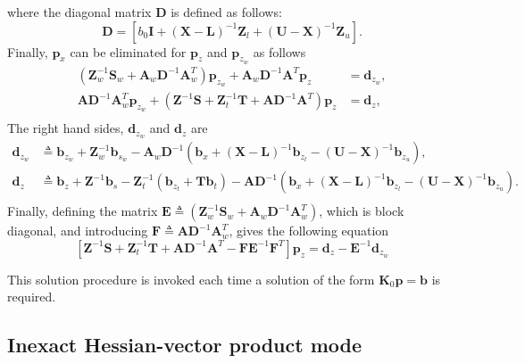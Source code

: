 \documentclass[12pt]{article}
\newcommand{\mb}{\mathbf}
\begin{document}
where the diagonal matrix $\mb{D}$ is defined as follows:
\begin{equation*}
  \mb{D} = \left[ b_{0} \mb{I} + (\mb{X} - \mb{L})^{-1}\mb{Z}_{l} + (\mb{U} - \mb{X})^{-1}\mb{Z}_{u} \right].
\end{equation*}
%
Finally, $\mb{p}_{x}$ can be eliminated for $\mb{p}_{z}$ and $\mb{p}_{z_{w}}$ as follows
\begin{equation}
  \begin{aligned}
    (\mb{Z}_{w}^{-1}\mb{S}_{w} + \mb{A}_{w}\mb{D}^{-1}\mb{A}_{w}^{T})\mb{p}_{z_{w}} + \mb{A}_{w}\mb{D}^{-1}\mb{A}^{T}\mb{p}_{z} &= \mb{d}_{z_{w}}, \\
    \mb{A}\mb{D}^{-1}\mb{A}_{w}^{T} \mb{p}_{z_{w}} + (\mb{Z}^{-1}\mb{S} + \mb{Z}_{t}^{-1}\mb{T} + \mb{A}\mb{D}^{-1}\mb{A}^{T})\mb{p}_{z} &= \mb{d}_{z}, \\
  \end{aligned}
\end{equation}
%
The right hand sides, $\mb{d}_{z_{w}}$ and $\mb{d}_{z}$ are 
\begin{equation*}
  \begin{aligned}
    \mb{d}_{z_{w}} &\triangleq \mb{b}_{z_{w}} + \mb{Z}_{w}^{-1}\mb{b}_{s_{w}} - \mb{A}_{w}\mb{D}^{-1}\left(\mb{b}_{x} + (\mb{X} - \mb{L})^{-1}\mb{b}_{z_{l}} - (\mb{U} - \mb{X})^{-1}\mb{b}_{z_{u}} \right), \\
    \mb{d}_{z} &\triangleq \mb{b}_{z} + \mb{Z}^{-1}\mb{b}_{s} - \mb{Z}_{t}^{-1}(\mb{b}_{z_{t}} + \mb{T}\mb{b}_{t}) - \mb{A}\mb{D}^{-1}\left(\mb{b}_{x} + (\mb{X} - \mb{L})^{-1}\mb{b}_{z_{l}} - (\mb{U} - \mb{X})^{-1}\mb{b}_{z_{u}} \right). \\
  \end{aligned}
\end{equation*}
%
Finally, defining the matrix $\mb{E} \triangleq (\mb{Z}_{w}^{-1}\mb{S}_{w} + \mb{A}_{w}\mb{D}^{-1}\mb{A}_{w}^{T})$, which is block diagonal, and introducing $\mb{F} \triangleq \mb{A}\mb{D}^{-1}\mb{A}_{w}^{T}$, gives the following equation
\begin{equation*}
  \left[\mb{Z}^{-1}\mb{S} + \mb{Z}_{t}^{-1}\mb{T} + \mb{A}\mb{D}^{-1}\mb{A}^{T} - \mb{F}\mb{E}^{-1}\mb{F}^{T} \right]\mb{p}_{z} = \mb{d}_{z} - \mb{E}^{-1} \mb{d}_{z_{w}}
\end{equation*}

This solution procedure is invoked each time a solution of the form $\mb{K}_{0}\mb{p} = \mb{b}$ is required. 

\subsection{Inexact Hessian-vector product mode}
\end{document}

